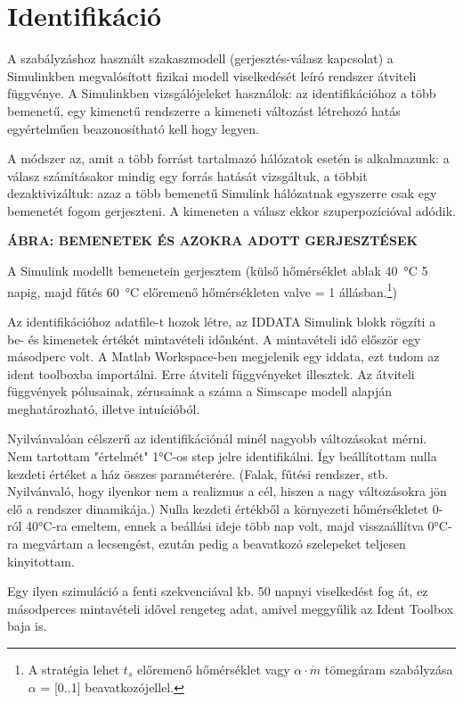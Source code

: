 \chapter{Identifikáció}\label{chap:ident}


A szabályzáshoz használt szakaszmodell (gerjesztés-válasz kapcsolat) a Simulinkben megvalósított fizikai modell viselkedését leíró rendszer átviteli függvénye. A Simulinkben vizsgálójeleket használok: az identifikációhoz a több bemenetű, egy kimenetű rendszerre a kimeneti változást létrehozó hatás egyértelműen beazonosítható kell hogy legyen.

A módszer az, amit a több forrást tartalmazó hálózatok esetén is alkalmazunk: a válasz számításakor mindig egy forrás hatását vizsgáltuk, a többit dezaktivizáltuk: azaz a több bemenetű Simulink hálózatnak egyszerre csak egy bemenetét fogom gerjeszteni. A kimeneten a válasz ekkor szuperpozícióval adódik. 

\textbf{ÁBRA: BEMENETEK ÉS AZOKRA ADOTT GERJESZTÉSEK}

A Simulink modellt bemenetein gerjesztem (külső hőmérséklet ablak \SI{40}{\celsius} 5 napig, majd fűtés \SI{60}{\celsius} előremenő hőmérsékleten valve = 1 állásban.\footnote{A stratégia lehet $t_s$ előremenő hőmérséklet vagy $\alpha \cdot \dot m$ tömegáram szabályzása $\alpha$ = [0..1] beavatkozójellel. })


Az identifikációhoz adatfile-t hozok létre, az IDDATA Simulink blokk rögzíti a be- és kimenetek értékét mintavételi időnként. A mintavételi idő először egy másodperc volt. A Matlab Workspace-ben megjelenik egy iddata, ezt tudom az ident toolboxba importálni. Erre átviteli függvényeket illesztek. Az átviteli függvények pólusainak, zérusainak a száma a Simscape modell alapján meghatározható, illetve intuícióból.

Nyilvánvalóan célszerű az identifikációnál minél nagyobb változásokat mérni. Nem tartottam "értelmét" 1\si{\celsius}-os step jelre identifikálni. Így beállítottam nulla kezdeti értéket a ház összes paraméterére. (Falak, fűtési rendszer, stb. Nyilvánvaló, hogy ilyenkor nem a realizmus a cél, hiszen a nagy változásokra jön elő a rendszer dinamikája.) Nulla kezdeti értékből a környezeti hőmérsékletet 0-ról 40\si{\celsius}-ra emeltem, ennek a beállási ideje több nap volt, majd visszaállítva 0\si{\celsius}-ra megvártam a lecsengést, ezután pedig a beavatkozó szelepeket teljesen kinyitottam. 

Egy ilyen szimuláció a fenti szekvenciával kb. 50 napnyi viselkedést fog át, ez másodperces mintavételi idővel rengeteg adat, amivel meggyűlik az Ident Toolbox baja is.

